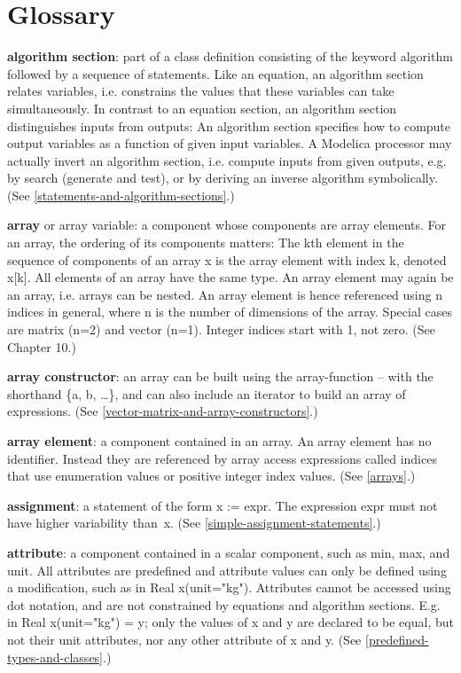 \documentclass[../MLS.tex]{subfiles}
\begin{document}
\chapter{Glossary}
\textbf{algorithm section}: part of a class definition consisting of the
keyword algorithm followed by a sequence of statements. Like an
equation, an algorithm section relates variables, i.e. constrains the
values that these variables can take simultaneously. In contrast to an
equation section, an algorithm section distinguishes inputs from
outputs: An algorithm section specifies how to compute output variables
as a function of given input variables. A Modelica processor may
actually invert an algorithm section, i.e. compute inputs from given
outputs, e.g. by search (generate and test), or by deriving an inverse
algorithm symbolically. (See \autoref{statements-and-algorithm-sections}.)

\textbf{array} or array variable: a component whose components are array
elements. For an array, the ordering of its components matters: The kth
element in the sequence of components of an array x is the array element
  with index k, denoted x{[}k{]}. All elements of an array have the same
  type. An array element may again be an array, i.e. arrays can be nested.
An array element is hence referenced using n indices in general, where n
is the number of dimensions of the array. Special cases are matrix (n=2)
and vector (n=1). Integer indices start with 1, not zero. (See Chapter
10.)

\textbf{array constructor}: an array can be built using the
array-function -- with the shorthand \{a, b, \ldots{}\}, and can also
include an iterator to build an array of expressions. (See \autoref{vector-matrix-and-array-constructors}.)

\textbf{array element}: a component contained in an array. An array
element has no identifier. Instead they are referenced by array access
expressions called indices that use enumeration values or positive
integer index values. (See \autoref{arrays}.)

\textbf{assignment}: a statement of the form x := expr. The expression
expr must not have higher variability than~x. (See \autoref{simple-assignment-statements}.)

\textbf{attribute}: a component contained in a scalar component, such as
min, max, and unit. All attributes are predefined and attribute values
can only be defined using a modification, such as in Real x(unit="kg").
Attributes cannot be accessed using dot notation, and are not
constrained by equations and algorithm sections. E.g. in Real
x(unit="kg") = y; only the values of x and y are declared to be equal,
but not their unit attributes, nor any other attribute of x and y. (See
\autoref{predefined-types-and-classes}.)
\end{document}
